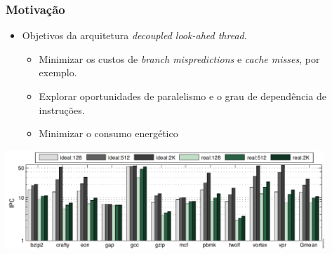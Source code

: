 \documentclass[10pt]{beamer}
\begin{document}
\begin{frame}
\frametitle{Motivação}

\begin{itemize}
\item Objetivos da arquitetura \textit{decoupled look-ahed thread}.

\begin{itemize} 
	\item Minimizar os custos de \textit{branch mispredictions} e \textit{cache
	misses}, por exemplo.
	
	\item Explorar oportunidades de paralelismo e o grau de dependência de
	instruções.
  
  	\item Minimizar o consumo energético 
	
\end{itemize} 
\end{itemize}

\vspace{12pt}
\centering
\includegraphics[width=0.9\textwidth]{images/single-ipc-full}

\end{frame}
\end{document}
